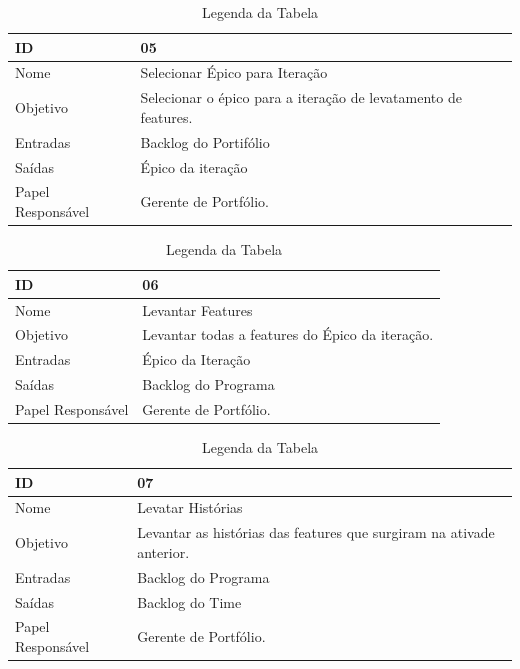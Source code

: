   \begin{table}[H]
    \centering
      \begin{tabular}{| m{5em} | m{10cm} |}
        \hline
        ID       & 05   \\ \hline
        Nome     & Selecionar Épico para Iteração   \\ \hline
        Objetivo & Selecionar o épico para a iteração de levatamento de features. \\ \hline
        Entradas & Backlog do Portifólio\\ \hline
        Saídas   & Épico da iteração \\ \hline
        Papel Responsável   & Gerente de Portfólio. \\ \hline
      \end{tabular}
      \caption{Legenda da Tabela}
      \label{tabela:atividade5}
  \end{table}

  \begin{table}[H]
    \centering
      \begin{tabular}{| m{5em} | m{10cm} |}
        \hline
        ID       & 06   \\ \hline
        Nome     & Levantar Features   \\ \hline
        Objetivo & Levantar todas a features do Épico da iteração. \\ \hline
        Entradas & Épico da Iteração\\ \hline
        Saídas   & Backlog do Programa \\ \hline
        Papel Responsável   & Gerente de Portfólio. \\ \hline
      \end{tabular}
      \caption{Legenda da Tabela}
      \label{tabela:atividade6}
  \end{table}

  \begin{table}[H]
    \centering
      \begin{tabular}{| m{5em} | m{10cm} |}
        \hline
        ID       & 07   \\ \hline
        Nome     & Levatar Histórias  \\ \hline
        Objetivo & Levantar as histórias das features que surgiram na ativade anterior.  \\ \hline
        Entradas & Backlog do Programa\\ \hline
        Saídas   & Backlog do Time \\ \hline
        Papel Responsável   & Gerente de Portfólio. \\ \hline
      \end{tabular}
      \caption{Legenda da Tabela}
      \label{tabela:atividade7}
  \end{table}

